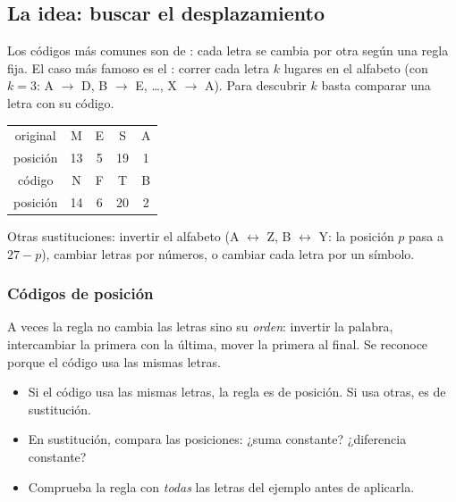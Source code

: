 

\subsection{La idea: buscar el desplazamiento}
Los códigos más comunes son de : cada letra se cambia por otra según una regla fija. El caso más
famoso es el : correr cada letra $k$ lugares en el alfabeto (con $k = 3$: A $\to$ D, B $\to$ E,
…, X $\to$ A). Para descubrir $k$ basta comparar una letra con su código.

\begin{center}\small
\begin{tabular}{c|cccc}
original & M & E & S & A\\
posición & 13 & 5 & 19 & 1\\\hline
código & N & F & T & B\\
posición & 14 & 6 & 20 & 2\\
\end{tabular}
\end{center}

Otras sustituciones: invertir el alfabeto (A $\leftrightarrow$ Z, B $\leftrightarrow$ Y: la posición $p$ pasa a
$27 - p$), cambiar letras por números, o cambiar cada letra por un símbolo.

\subsubsection{Códigos de posición}
A veces la regla no cambia las letras sino su \emph{orden}: invertir la palabra, intercambiar la primera con la última,
mover la primera al final. Se reconoce porque el código usa las mismas letras.


\begin{regla}
\begin{itemize}
  \item Si el código usa las mismas letras, la regla es de posición. Si usa otras, es de sustitución.
  \item En sustitución, compara las posiciones: ¿suma constante? ¿diferencia constante?
  \item Comprueba la regla con \emph{todas} las letras del ejemplo antes de aplicarla.
\end{itemize}
\end{regla}

